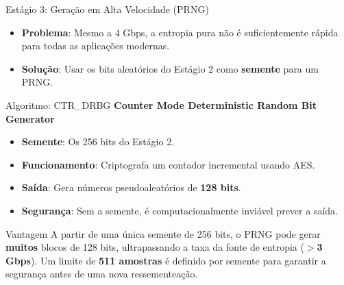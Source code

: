 \begin{frame}{Estágio 3: Geração em Alta Velocidade (PRNG)}
    \begin{itemize}
        \item \textbf{Problema}: Mesmo a 4 Gbps, a entropia pura não é suficientemente rápida para todas as aplicações modernas.
        \item \textbf{Solução}: Usar os bits aleatórios do Estágio 2 como \textbf{semente} para um PRNG.
    \end{itemize}

    \begin{block}{Algoritmo: CTR\_DRBG}
        \textbf{Counter Mode Deterministic Random Bit Generator}
        \begin{itemize}
            \item \textbf{Semente}: Os 256 bits do Estágio 2.
            \item \textbf{Funcionamento}: Criptografa um contador incremental usando AES.
            \item \textbf{Saída}: Gera números pseudoaleatórios de \textbf{128 bits}.
            \item \textbf{Segurança}:  Sem a semente, é computacionalmente inviável prever a saída.
        \end{itemize}
    \end{block}

    \begin{exampleblock}{Vantagem}
        A partir de uma única semente de 256 bits, o PRNG pode gerar \textbf{muitos} blocos de 128 bits, ultrapassando a taxa da fonte de entropia (\textbf{$>$3 Gbps}). Um limite de \textbf{511 amostras} é definido por semente para garantir a segurança antes de uma nova ressementeação.
    \end{exampleblock}
\end{frame}

